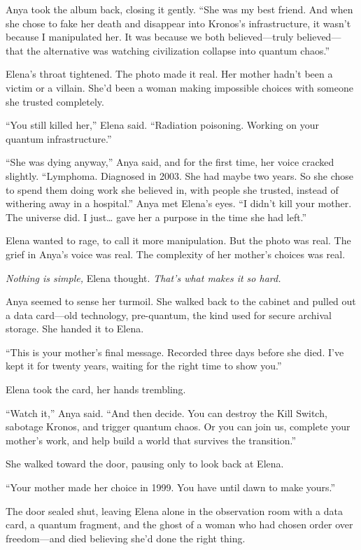 Anya took the album back, closing it gently. ``She was my best friend. And when she chose to fake her death and disappear into Kronos's infrastructure, it wasn't because I manipulated her. It was because we both believed---truly believed---that the alternative was watching civilization collapse into quantum chaos.''

Elena's throat tightened. The photo made it real. Her mother hadn't been a victim or a villain. She'd been a woman making impossible choices with someone she trusted completely.

``You still killed her,'' Elena said. ``Radiation poisoning. Working on your quantum infrastructure.''

``She was dying anyway,'' Anya said, and for the first time, her voice cracked slightly. ``Lymphoma. Diagnosed in 2003. She had maybe two years. So she chose to spend them doing work she believed in, with people she trusted, instead of withering away in a hospital.'' Anya met Elena's eyes. ``I didn't kill your mother. The universe did. I just\ldots{} gave her a purpose in the time she had left.''

Elena wanted to rage, to call it more manipulation. But the photo was real. The grief in Anya's voice was real. The complexity of her mother's choices was real.

\emph{Nothing is simple,} Elena thought. \emph{That's what makes it so hard.}

Anya seemed to sense her turmoil. She walked back to the cabinet and pulled out a data card---old technology, pre-quantum, the kind used for secure archival storage. She handed it to Elena.

``This is your mother's final message. Recorded three days before she died. I've kept it for twenty years, waiting for the right time to show you.''

Elena took the card, her hands trembling.

``Watch it,'' Anya said. ``And then decide. You can destroy the Kill Switch, sabotage Kronos, and trigger quantum chaos. Or you can join us, complete your mother's work, and help build a world that survives the transition.''

She walked toward the door, pausing only to look back at Elena.

``Your mother made her choice in 1999. You have until dawn to make yours.''

The door sealed shut, leaving Elena alone in the observation room with a data card, a quantum fragment, and the ghost of a woman who had chosen order over freedom---and died believing she'd done the right thing.


